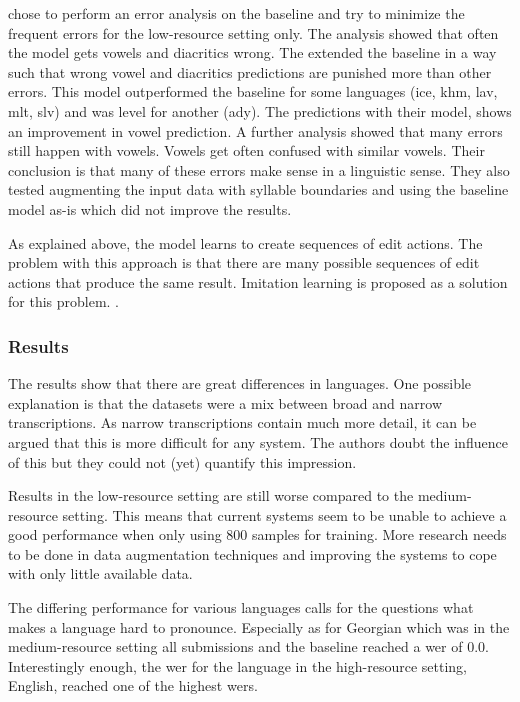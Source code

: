 \citet{lo-nicolai-2021-linguistic} chose to perform an error analysis on the baseline and try to minimize the frequent errors for the low-resource setting only. The analysis showed that often the model gets vowels and diacritics wrong. The extended the baseline in a way such that wrong vowel and diacritics predictions are punished more than other errors. This model outperformed the baseline for some languages (ice, khm, lav, mlt, slv) and was level for another (ady). The predictions with their model, shows an improvement in vowel prediction. A further analysis showed that many errors still happen with vowels. Vowels get often confused with similar vowels. Their conclusion is that many of these errors make sense in a linguistic sense.   
They also tested augmenting the input data with syllable boundaries and using the baseline model as-is which did not improve the results. 

As explained above, the model learns to create sequences of edit actions. The problem with this approach is that there are many possible sequences of edit actions that produce the same result. Imitation learning is proposed as a solution for this problem. . 

\subsubsection*{Results}
The results show that there are great differences in languages. One possible explanation is that the datasets were a mix between broad and narrow transcriptions. As narrow transcriptions contain much more detail, it can be argued that this is more difficult for any system. The authors doubt the influence of this but they could not (yet) quantify this impression. 

Results in the low-resource setting are still worse compared to the medium-resource setting. This means that current systems seem to be unable to achieve a good performance when only using 800 samples for training. More research needs to be done in data augmentation techniques and improving the systems to cope with only little available data.

The differing performance for various languages calls for the questions what makes a language hard to pronounce. Especially as for Georgian which was in the medium-resource setting all submissions and the baseline reached a \ac{wer} of $0.0$. Interestingly enough, the \ac{wer} for the language in the high-resource setting, English, reached one of the highest \ac{wer}s.



